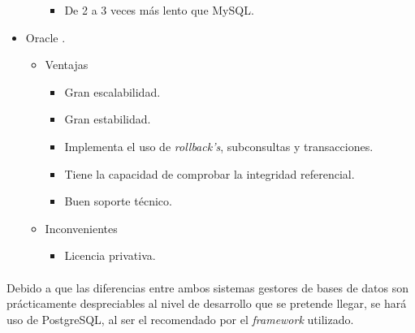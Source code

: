 \begin{itemize}
\begin{itemize}
\begin{itemize}
             \item De 2 a 3 veces más lento que MySQL.
            \end{itemize}
      \end{itemize}
      \item Oracle \cite{oracle}.
      \begin{itemize}
         \item Ventajas
            \begin{itemize}
             \item Gran escalabilidad.
             \item Gran estabilidad.
             \item Implementa el uso de \textit{rollback's}, subconsultas y
                   transacciones.
             \item Tiene la capacidad de comprobar la integridad referencial.
             \item Buen soporte técnico.
            \end{itemize}
         \item Inconvenientes
            \begin{itemize}
             \item Licencia privativa.
            \end{itemize}
      \end{itemize}
   \end{itemize}

   \paragraph{}Debido a que las diferencias entre ambos sistemas gestores de
   bases de datos son prácticamente despreciables al nivel de desarrollo que
   se pretende llegar, se hará uso de PostgreSQL, al ser el recomendado por el
   \textit{framework} utilizado.